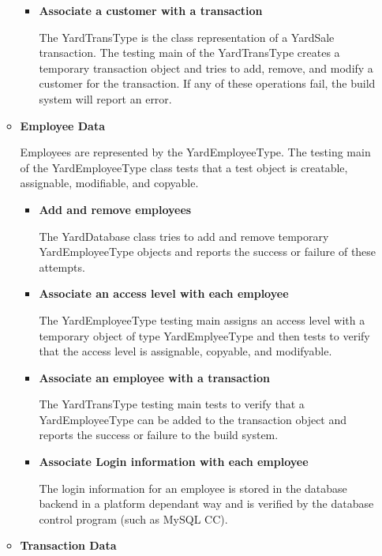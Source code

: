 \documentclass{report}
\begin{document}
\begin{itemize}
\begin{itemize}
\begin{itemize}
		  \item{\textbf{Associate a customer with a transaction}}

		  The YardTransType is the class representation of a YardSale transaction.  The testing main of the
		YardTransType creates a temporary transaction object and tries to add, remove, and modify a customer
		for the transaction.  If any of these operations fail, the build system will report an error.

                \end{itemize}
                \item {\textbf{Employee Data}}

			Employees are represented by the YardEmployeeType.  The testing main of the YardEmployeeType class
			tests that a test object is creatable, assignable, modifiable, and copyable.

                \begin{itemize}
                    \item{\textbf{Add and remove employees}}

		    	The YardDatabase class tries to add and remove temporary YardEmployeeType objects and reports
			the success or failure of these attempts.

                    \item{\textbf{Associate an access level with each employee}}

			The YardEmployeeType testing main assigns an access level with a temporary object of type
			YardEmplyeeType and then tests to verify that the access level is assignable, copyable, and
			modifyable.

                    \item{\textbf{Associate an employee with a transaction}}

		    	The YardTransType testing main tests to verify that a YardEmployeeType can be added to the
			transaction object and reports the success or failure to the build system.

                    \item{\textbf{Associate Login information with each employee}}

		    The login information for an employee is stored in the database backend in a platform dependant way
		    and is verified by the database control program (such as MySQL CC).
                \end{itemize}
                \item{\textbf{Transaction Data}}


\end{itemize}
\end{itemize}
\end{document}
